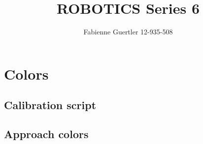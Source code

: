 \documentclass[a4paper]{article}
\title{ROBOTICS Series 6}
\author{Fabienne Guertler 12-935-508}
\begin{document}
	\section{Colors}
	\subsection{Calibration script}
	\subsection{Approach colors}
	
\end{document}
